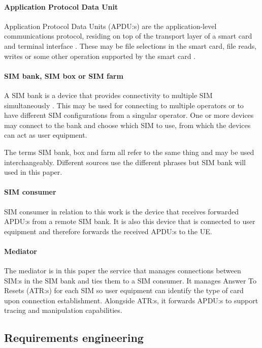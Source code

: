 \paragraph{Application Protocol Data Unit}

Application Protocol Data Units (APDU:s) are the application-level
communications protocol, residing on top of the transport layer of
a smart card and terminal interface \cite{etsi-ts-102-221}. These
may be file selections in the smart card, file reads, writes or
some other operation supported by the smart card \cite{etsi-ts-102-221}.

\paragraph{SIM bank, SIM box or SIM farm}

A SIM bank is a device that provides connectivity to multiple SIM
simultaneously \cite{hyprms-sim-bank}. This may be used for
connecting to multiple operators or to have different SIM
configurations from a singular operator. One or more devices may
connect to the bank and choose which SIM to use, from which the
devices can act as user equipment.

The terms SIM bank, box and farm all refer to the same thing and
may be used interchangeably. Different sources use the different
phrases but SIM bank will used in this paper.

\paragraph{SIM consumer}

SIM consumer in relation to this work is the device that receives
forwarded APDU:s from a remote SIM bank. It is also this device
that is connected to user equipment and therefore forwards the
received APDU:s to the UE.

\paragraph{Mediator}

The mediator is in this paper the service that manages connections
between SIM:s in the SIM bank and ties them to a SIM consumer. It
manages Answer To Resets (ATR:s) for each SIM so user equipment
can identify the type of card upon connection establishment.
Alongside ATR:s, it forwards APDU:s to support tracing and
manipulation capabilities.

\subsection{Requirements engineering}

